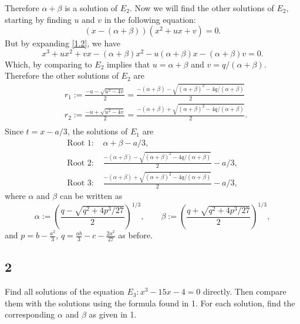 \documentclass[12pt]{article}
\begin{document}
Therefore $\alpha + \beta$ is a solution of $E_{2}$. Now we will find the other solutions of $E_{2}$, starting by finding $u$ and $v$ in the following equation:
\begin{equation}
(x - (\alpha + \beta))(x^{2} + ux + v) = 0.
\label{1.2}
\end{equation}
But by expanding \eqref{1.2}, we have 
\[ x^{3} + ux^{2} + vx - (\alpha + \beta)x^{2} - u(\alpha + \beta)x - (\alpha + \beta)v = 0. \]
Which, by comparing to $E_{2}$ implies that $u = \alpha + \beta$ and $v = q / (\alpha + \beta)$. Therefore the other solutions of $E_{2}$ are 
\begin{align*}
& r_{1} := \frac{-u - \sqrt{u^{2} - 4v}}{2} = \frac{-(\alpha + \beta) - \sqrt{(\alpha+\beta)^{2} - 4q/(\alpha+\beta)}}{2} \\
& r_{2} := \frac{-u + \sqrt{u^{2} - 4v}}{2} = \frac{-(\alpha + \beta) + \sqrt{(\alpha+\beta)^{2} - 4q/(\alpha+\beta)}}{2}. \\
\end{align*}
Since $t = x - a / 3$, the solutions of $E_{1}$ are 
\begin{align*}
\text{Root 1: } & \alpha + \beta - a/3, \\
\text{Root 2: } & \frac{-(\alpha + \beta) - \sqrt{(\alpha+\beta)^{2} - 4q/(\alpha+\beta)}}{2} - a/3, \\
\text{Root 3: } & \frac{-(\alpha + \beta) + \sqrt{(\alpha+\beta)^{2} - 4q/(\alpha+\beta)}}{2} - a/3,
\end{align*}
where $\alpha$ and $\beta$ can be written as 
\[ \alpha := \left( \frac{q - \sqrt{q^{2} + 4p^{3}/27}}{2} \right)^{1/3}, \qquad \beta := \left( \frac{q + \sqrt{q^{2} + 4p^{3}/27}}{2} \right)^{1/3},
\]
and $p = b - \frac{a^{2}}{3}$, $q = \frac{ab}{3} - c - \frac{2a^{2}}{27}$ as before.






\subsection*{2}
Find all solutions of the equation $E_{3} : x^{3} - 15x - 4 = 0$ directly. Then compare them with the solutions using the formula found in 1. For each
solution, find the corresponding $\alpha$ and $\beta$ as given in 1.
\end{document}
